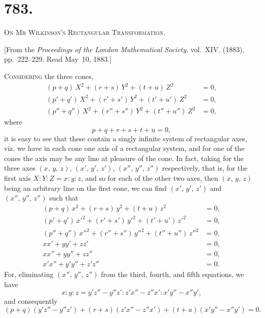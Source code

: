 \documentclass[11pt,a4paper]{article}
\theoremstyle{cayley}
\begin{document}
\newpage

\section*{783.}

\begin{center}
\Large\scshape On Mr Wilkinson's Rectangular Transformation.
\end{center}

\begin{center}
[From the \textit{Proceedings of the London Mathematical Society}, vol.~XIV. (1883), pp.~222--229. Read May~10, 1883.]
\end{center}

\textsc{Considering} the three cones,
\begin{align*}
(p+q)\,X^{2} + (r+s)\,Y^{2} + (t+u)\,Z^{2} &= 0,\\
(p'+q')\,X^{2} + (r'+s')\,Y^{2} + (t'+u')\,Z^{2} &= 0,\\
(p''+q'')\,X^{2} + (r''+s'')\,Y^{2} + (t''+u'')\,Z^{2} &= 0,
\end{align*}
where
\[
p+q+r+s+t+u = 0,
\]
it is easy to see that these contain a singly infinite system of rectangular axes, viz. we have in each cone one axis of a rectangular system, and for one of the cones the axis may be any line at pleasure of the cone. In fact, taking for the three axes $(x,\, y,\, z)$, $(x',\, y',\, z')$, $(x'',\, y'',\, z'')$ respectively, that is, for the first axis $X : Y : Z = x : y : z$, and so for each of the other two axes, then $(x,\, y,\, z)$ being an arbitrary line on the first cone, we can find $(x',\, y',\, z')$ and $(x'',\, y'',\, z'')$ such that
\begin{align*}
(p+q)\,x^{2} + (r+s)\,y^{2} + (t+u)\,z^{2} &= 0,\\
(p'+q')\,x'^{2} + (r'+s')\,y'^{2} + (t'+u')\,z'^{2} &= 0,\\
(p''+q'')\,x''^{2} + (r''+s'')\,y''^{2} + (t''+u'')\,z''^{2} &= 0,\\
xx' + yy' + zz' &= 0,\\
xx'' + yy'' + zz'' &= 0,\\
x'x'' + y'y'' + z'z'' &= 0.
\end{align*}
For, eliminating $(x'',\, y'',\, z'')$ from the third, fourth, and fifth equations, we have
\[
x : y : z = y'z'' - y''z' : z'x'' - z''x' : x'y'' - x''y',
\]
and consequently
\[
(p+q)(y'z'' - y''z') + (r+s)(z'x'' - z''x') + (t+u)(x'y'' - x''y') = 0.
\]
\end{document}
